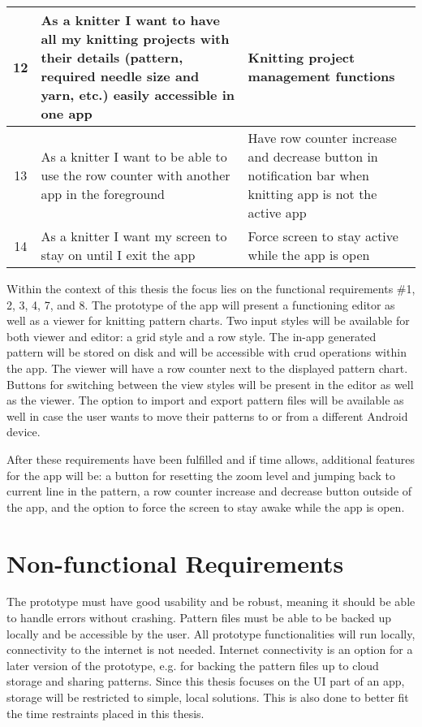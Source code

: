 \begin{longtable}{| c | p{6.5cm} | p{6.5cm} |}
	12 & As a knitter I want to have all my knitting projects with their details (pattern, required needle size and yarn, etc.) easily accessible in one app & Knitting project management functions  \\ \hline
	13 & As a knitter I want to be able to use the row counter with another app in the foreground &  Have row counter increase and decrease button in notification bar when knitting app is not the active app \\ \hline
	14 & As a knitter I want my screen to stay on until I exit the app & Force screen to stay active while the app is open \\ \hline
\end{longtable}

Within the context of this thesis the focus lies on the functional requirements \#1, 2, 3, 4, 7, and 8. The prototype of the app will present a functioning editor as well as a viewer for knitting pattern charts. Two input styles will be available for both viewer and editor: a grid style and a row style. The in-app generated pattern will be stored on disk and will be accessible with \gls{crud} operations within the app. The viewer will have a row counter next to the displayed pattern chart. Buttons for switching between the view styles will be present in the editor as well as the viewer. The option to import and export pattern files will be available as well in case the user wants to move their patterns to or from a different Android device. 

After these requirements have been fulfilled and if time allows, additional features for the app will be: a button for resetting the zoom level and jumping back to current line in the pattern, a row counter increase and decrease button outside of the app, and the option to force the screen to stay awake while the app is open.

\section{Non-functional Requirements}

The prototype must have good usability and be robust, meaning it should be able to handle errors without crashing. Pattern files must be able to be backed up locally and be accessible by the user. All prototype functionalities will run locally, connectivity to the internet is not needed. Internet connectivity is an option for a later version of the prototype, e.g. for backing the pattern files up to cloud storage and sharing patterns. Since this thesis focuses on the \gls{UI} part of an app, storage will be restricted to simple, local solutions. This is also done to better fit the time restraints placed in this thesis. 